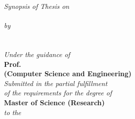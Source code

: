 \begin{titlepage}
\begin{center}
{\large {\textit{Synopsis of Thesis on}}}\\
\Large{\textbf{ \SynopsisTitle}}\\
\vspace{15pt}
\normalsize \emph {by}\\
\vspace{15pt}
\Large{\textbf{\Auth}} \\
\normalsize{\textsf{\bf \Entry}}\\
\vspace{25pt}
{\normalsize \emph {Under the guidance of}} \\
\Large{\textbf{Prof. \Guide{}}} \\
\normalsize{\textsf{\bf (Computer Science and Engineering)\\ }}
\vspace{20pt}
{\normalsize \emph {Submitted in the partial fulfillment \\of the requirements for the degree of}}\\
\vspace{10pt}
{\large \textbf{Master of Science (Research)}}\\

\vspace{15pt}
{\normalsize \emph {to the}}

\vspace{10pt}


\end{center}
\end{titlepage}
